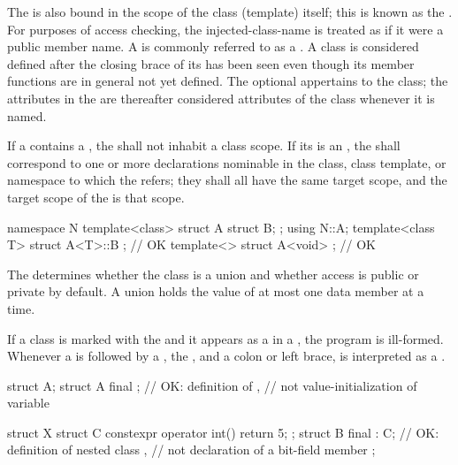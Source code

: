 \pnum
The
 is also bound in the scope of the class (template)
itself; this is known as the .
For purposes of access checking, the injected-class-name is treated as
if it were a public member name.
A  is commonly referred to as a .
A class is considered defined after the closing brace of its
 has been seen even though its member
functions are in general not yet defined.
The optional  appertains to the class; the attributes in
the  are thereafter considered attributes of the class
whenever it is named.

\pnum
If a  contains a ,
the  shall not inhabit a class scope.
If its  is an ,
the  shall correspond to
one or more declarations nominable in
the class, class template, or namespace to which the
 refers;
they shall all have the same target scope, and the target scope of the
 is that scope.
\begin{example}
\begin{codeblock}
namespace N {
  template<class>
  struct A {
    struct B;
  };
}
using N::A;
template<class T> struct A<T>::B {};    // OK
template<> struct A<void> {};           // OK
\end{codeblock}
\end{example}

\pnum
\begin{note}
The  determines
whether the class is a union and
whether access is public or private by default.
A union holds the value of at most one data member at a time.
\end{note}

\pnum
If a class is marked with the   and it appears
as a  in a ,
the program is ill-formed. Whenever a
 is followed by a , the
 , and a colon or left brace,  is
interpreted as a .
\begin{example}
\begin{codeblock}
struct A;
struct A final {};      // OK: definition of ,
                        // not value-initialization of variable 

struct X {
 struct C { constexpr operator int() { return 5; } };
 struct B final : C{};  // OK: definition of nested class ,
                        // not declaration of a bit-field member 
};
\end{codeblock}
\end{example}

